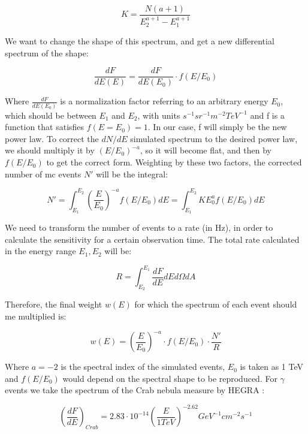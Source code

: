 \documentclass[main.tex]{subfiles}
\begin{document}
\begin{equation}
  K = \frac{N(a+1)}{E_{2}^{a+1}-E_{1}^{a+1}}
\end{equation}

We want to change the shape of this spectrum, and get a new differential spectrum of the shape:

\begin{equation}
  \frac{dF}{dE(E)} = \frac{dF}{dE(E_0)}\cdot f(E/E_0)
\end{equation}

Where $\frac{dF}{dE(E_0)}$ is a normalization factor referring to an arbitrary energy $E_0$, which should be between $E_{1}$ and $E_{2}$, with units $s^{-1}sr^{-1}m^{-2}TeV^{-1}$ and f is a function that satisfies $f(E=E_{0}) = 1$. In our case, f will simply be the new power law. To correct the $dN/dE$  simulated spectrum to the desired power law, we should multiply it by $(E/E_{0})^{-a}$, so it will become flat, and then by $f(E/E_{0})$ to get the correct form. Weighting by these two factors, the corrected number of \gls{mc} events $N'$ will be the integral:

\begin{equation}
  N' = \int^{E_{2}}_{E_{1}} \left(\frac{E}{E_{0}}\right)^{-a} f(E/E_{0}) dE = \int^{E_{2}}_{E_{1}} KE_{0}^{a}f(E/E_{0})dE
\end{equation}

We need to transform the number of events to a rate (in Hz), in order to calculate the sensitivity for a certain observation time. The total rate calculated in the energy range $E_{1}, E_{2}$ will be:

\begin{equation}
  R = \int^{E_{1}}_{E_{2}} \frac{dF}{dE}dE d\Omega dA
\end{equation}

Therefore, the final weight $w(E)$ for which the spectrum of each event should me multiplied is:

\begin{equation}
  w(E) = \left(\frac{E}{E_0}\right)^{-a}\cdot f(E/E_{0}) \cdot \frac{N'}{R}
\end{equation}

Where $a=-2$ is the spectral index of the simulated events, $E_{0}$ is taken as 1 TeV and $f(E/E_{0})$ would depend on the spectral shape to be reproduced. For $\gamma$ events we take the spectrum of the Crab nebula measure by HEGRA \cite{2004CrabHEGRA}:

\begin{equation}
  \left(\frac{dF}{dE}\right)_{Crab} = 2.83\cdot 10^{-14} \left(\frac{E}{1 TeV}\right)^{-2.62} GeV^{-1}cm^{-2}s^{-1}
\end{equation}
\end{document}

